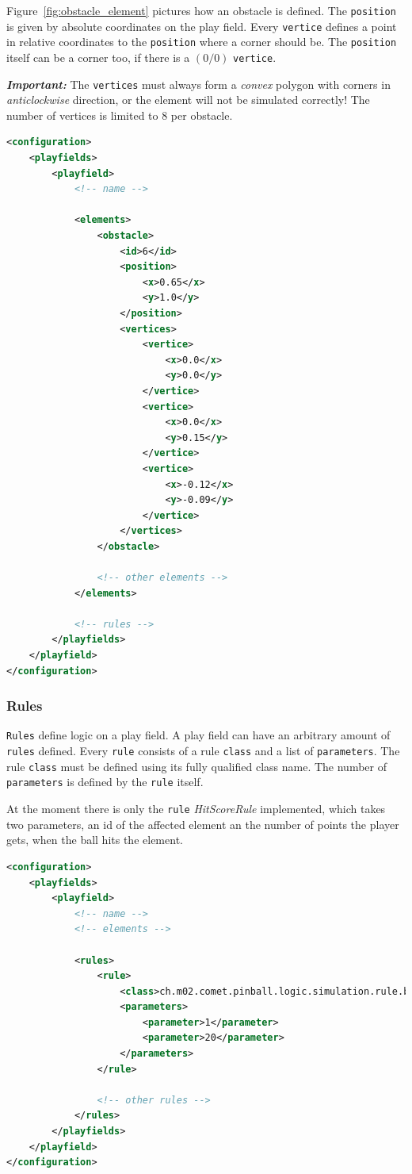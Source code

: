 \documentclass[fontsize=12pt,
               paper=a4,
               twoside=false,
               parskip=half,
               ]{scrartcl}
\begin{document}
Figure~\ref{fig:obstacle_element} pictures how an obstacle is defined. The \texttt{position} is given by absolute coordinates on the play field. Every \texttt{vertice} defines a point in relative coordinates to the \texttt{position} where a corner should be. The \texttt{position} itself can be a corner too, if there is a $(0/0)$ \texttt{vertice}.

\textbf{\textsl{Important:}} The \texttt{vertices} must always form a \textsl{convex} polygon with corners in \textsl{anticlockwise} direction, or the element will not be simulated correctly! The number of vertices is limited to 8 per obstacle.

\begin{minipage}[]{\linewidth}
\begin{lstlisting}[language=xml,label=lst:obstacle,caption={obstacle}]
<configuration>
	<playfields>
		<playfield>
			<!-- name -->
			
			<elements>
				<obstacle>
					<id>6</id>
					<position>
						<x>0.65</x>
						<y>1.0</y>
					</position>
					<vertices>
						<vertice>
							<x>0.0</x>
							<y>0.0</y>
						</vertice>
						<vertice>
							<x>0.0</x>
							<y>0.15</y>
						</vertice>
						<vertice>
							<x>-0.12</x>
							<y>-0.09</y>
						</vertice>
					</vertices>
				</obstacle>
				
				<!-- other elements -->
			</elements>
			
			<!-- rules -->
		</playfields>
	</playfield>
</configuration>
\end{lstlisting}
\end{minipage}

\subsubsection{Rules}

\texttt{Rules} define logic on a play field. A play field can have an arbitrary amount of \texttt{rules} defined. Every \texttt{rule} consists of a rule \texttt{class} and a list of \texttt{parameters}. The rule \texttt{class} must be defined using its fully qualified class name. The number of \texttt{parameters} is defined by the \texttt{rule} itself.

At the moment there is only the \texttt{rule} \emph{HitScoreRule} implemented, which takes two parameters, an id of the affected element an the number of points the player gets, when the ball hits the element.

\begin{minipage}[]{\linewidth}
\begin{lstlisting}[language=xml,label=lst:rule,caption={rule}]
<configuration>
	<playfields>
		<playfield>
			<!-- name -->
			<!-- elements -->
			
			<rules>
				<rule>
					<class>ch.m02.comet.pinball.logic.simulation.rule.basic.HitScoreRule</class>
					<parameters>
						<parameter>1</parameter>
						<parameter>20</parameter>
					</parameters>
				</rule>
				
				<!-- other rules -->
			</rules>
		</playfields>
	</playfield>
</configuration>
\end{lstlisting}
\end{minipage}
\end{document}
